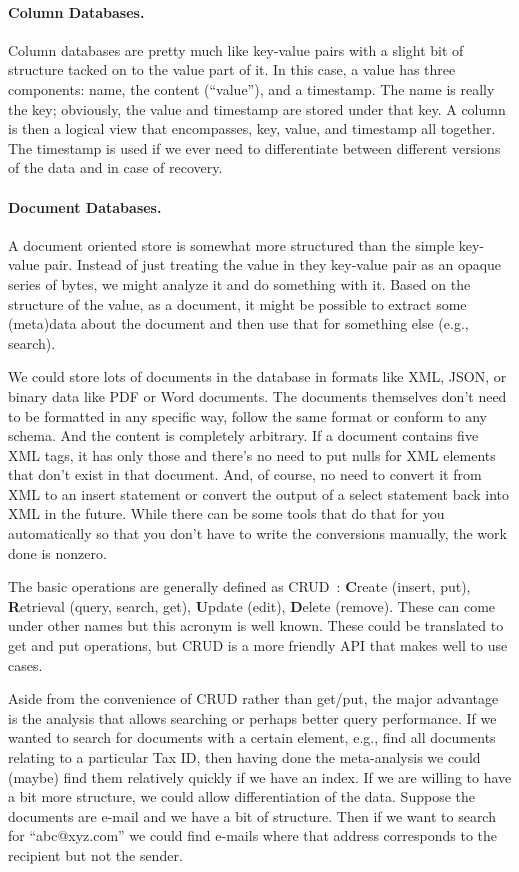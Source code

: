 \documentclass[a4paper]{report}
\begin{document}
\paragraph{Column Databases.}
Column databases are pretty much like key-value pairs with a slight bit of structure tacked on to the value part of it. In this case, a value has three components: name, the content (``value''), and a timestamp. The name is really the key; obviously, the value and timestamp are stored under that key. A column is then a logical view that encompasses, key, value, and timestamp all together. The timestamp is used if we ever need to differentiate between different versions of the data and in case of recovery.

\paragraph{Document Databases.} 

A document oriented store is somewhat more structured than the simple key-value pair. Instead of just treating the value in they key-value pair as an opaque series of bytes, we might analyze it and do something with it. Based on the structure of the value, as a document, it might be possible to extract some (meta)data about the document and then use that for something else (e.g., search). 

We could store lots of documents in the database in formats like XML, JSON, or binary data like PDF or Word documents. The documents themselves don't need to be formatted in any specific way, follow the same format or conform to any schema. And the content is completely arbitrary. If a document contains five XML tags, it has only those and there's no need to put nulls for XML elements that don't exist in that document. And, of course, no need to convert it from XML to an insert statement or convert the output of a select statement back into XML in the future. While there can be some tools that do that for you automatically so that you don't have to write the conversions manually, the work done is nonzero.

The basic operations are generally defined as CRUD~\cite{martin1983managing}: \textbf{C}reate (insert, put), \textbf{R}etrieval (query, search, get), \textbf{U}pdate (edit), \textbf{D}elete (remove). These can come under other names but this acronym is well known. These could be translated to get and put operations, but CRUD is a more friendly API that makes well to use cases.

Aside from the convenience of CRUD rather than get/put, the major advantage is the analysis that allows searching or perhaps better query performance. If we wanted to search for documents with a certain element, e.g., find all documents relating to a particular Tax ID, then having done the meta-analysis we could (maybe) find them relatively quickly if we have an index. If we are willing to have a bit more structure, we could allow differentiation of the data. Suppose the documents are e-mail and we have a bit of structure. Then if we want to search for ``abc@xyz.com'' we could find e-mails where that address corresponds to the recipient but not the sender.
\end{document}
